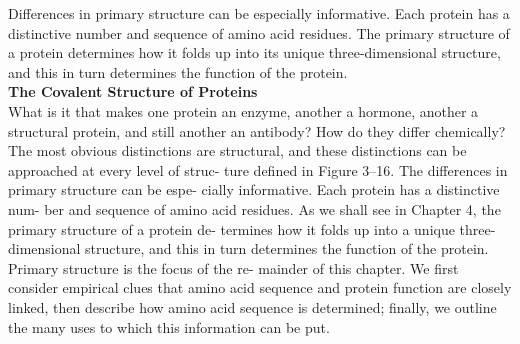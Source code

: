 Differences in primary structure can be especially informative. Each protein has a distinctive number and sequence of amino acid residues. The primary structure of a protein determines how it folds up into its unique three-dimensional structure, and this in turn determines the function of the protein.
\\
\textbf{The Covalent Structure of Proteins}\\
What is it that makes one protein an enzyme, another a hormone, another a structural protein, and still another an antibody? How do they differ chemically? The most obvious distinctions are structural, and these distinctions can be approached at every level of struc- ture defined in Figure 3–16.
The differences in primary structure can be espe- cially informative. Each protein has a distinctive num- ber and sequence of amino acid residues. As we shall see in Chapter 4, the primary structure of a protein de- termines how it folds up into a unique three-dimensional structure, and this in turn determines the function of the protein. Primary structure is the focus of the re- mainder of this chapter. We first consider empirical clues that amino acid sequence and protein function are closely linked, then describe how amino acid sequence is determined; finally, we outline the many uses to which this information can be put.

